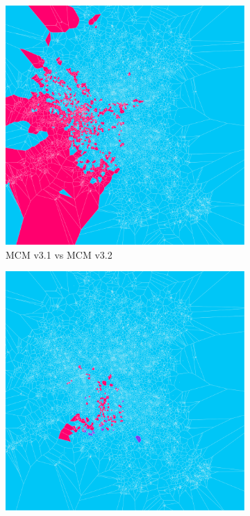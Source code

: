 \begin{figure}[H]
     \centering
     \begin{subfigure}[b]{.49\textwidth}
         \centering \includegraphics[width=\textwidth]{m31_m32.png}
         \caption{MCM v3.1 vs MCM v3.2}
         \label{fig:m1to2}
     \end{subfigure}
     \begin{subfigure}[b]{.49\textwidth}
         \centering \includegraphics[width=\textwidth]{m32_m33.png}

\end{subfigure}
\end{figure}
